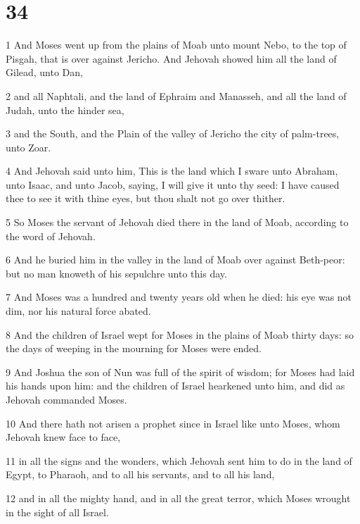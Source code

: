 \chapter{34}

\par 1 And Moses went up from the plains of Moab unto mount Nebo, to the top of Pisgah, that is over against Jericho. And Jehovah showed him all the land of Gilead, unto Dan,
\par 2 and all Naphtali, and the land of Ephraim and Manasseh, and all the land of Judah, unto the hinder sea,
\par 3 and the South, and the Plain of the valley of Jericho the city of palm-trees, unto Zoar.
\par 4 And Jehovah said unto him, This is the land which I sware unto Abraham, unto Isaac, and unto Jacob, saying, I will give it unto thy seed: I have caused thee to see it with thine eyes, but thou shalt not go over thither.
\par 5 So Moses the servant of Jehovah died there in the land of Moab, according to the word of Jehovah.
\par 6 And he buried him in the valley in the land of Moab over against Beth-peor: but no man knoweth of his sepulchre unto this day.
\par 7 And Moses was a hundred and twenty years old when he died: his eye was not dim, nor his natural force abated.
\par 8 And the children of Israel wept for Moses in the plains of Moab thirty days: so the days of weeping in the mourning for Moses were ended.
\par 9 And Joshua the son of Nun was full of the spirit of wisdom; for Moses had laid his hands upon him: and the children of Israel hearkened unto him, and did as Jehovah commanded Moses.
\par 10 And there hath not arisen a prophet since in Israel like unto Moses, whom Jehovah knew face to face,
\par 11 in all the signs and the wonders, which Jehovah sent him to do in the land of Egypt, to Pharaoh, and to all his servants, and to all his land,
\par 12 and in all the mighty hand, and in all the great terror, which Moses wrought in the sight of all Israel.

